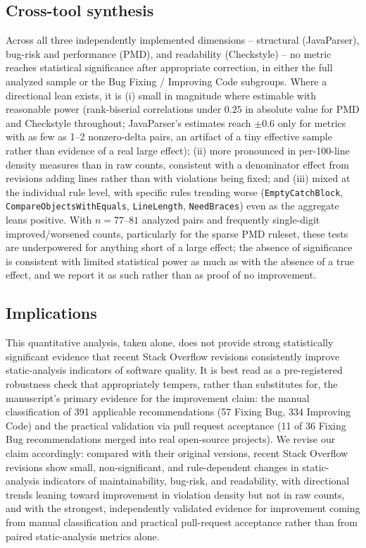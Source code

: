 \subsection{Cross-tool synthesis}
\label{sec:before-after-synthesis}

Across all three independently implemented dimensions -- structural
(JavaParser), bug-risk and performance (PMD), and readability
(Checkstyle) -- no metric reaches statistical significance after
appropriate correction, in either the full analyzed sample or the Bug
Fixing / Improving Code subgroups. Where a directional lean exists, it is
(i) small in magnitude where estimable with reasonable power (rank-biserial
correlations under $0.25$ in absolute value for PMD and Checkstyle
throughout; JavaParser's estimates reach $\pm0.6$ only for metrics with
as few as 1--2 nonzero-delta pairs, an artifact of a tiny effective
sample rather than evidence of a real large effect); (ii) more pronounced
in per-100-line density
measures than in raw counts, consistent with a denominator effect from
revisions adding lines rather than with violations being fixed; and
(iii) mixed at the individual rule level, with specific rules trending
worse (\texttt{EmptyCatchBlock}, \texttt{CompareObjectsWithEquals},
\texttt{LineLength}, \texttt{NeedBraces}) even as the aggregate leans
positive. With $n=77$--$81$ analyzed pairs and frequently single-digit
improved/worsened counts, particularly for the sparse PMD ruleset, these
tests are underpowered for anything short of a large effect; the
absence of significance is consistent with limited statistical power as
much as with the absence of a true effect, and we report it as such
rather than as proof of no improvement.

\subsection{Implications}
\label{sec:before-after-implications}

This quantitative analysis, taken alone, does not provide strong
statistically significant evidence that recent Stack Overflow revisions
consistently improve static-analysis indicators of software quality. It
is best read as a pre-registered robustness check that appropriately
tempers, rather than substitutes for, the manuscript's primary evidence
for the improvement claim: the manual classification of 391 applicable
recommendations (57 Fixing Bug, 334 Improving Code) and the practical
validation via pull request acceptance (11 of 36 Fixing Bug
recommendations merged into real open-source projects). We revise our
claim accordingly: compared with their original versions, recent Stack
Overflow revisions show small, non-significant, and rule-dependent
changes in static-analysis indicators of maintainability, bug-risk, and
readability, with directional trends leaning toward improvement in
violation density but not in raw counts, and with the strongest,
independently validated evidence for improvement coming from manual
classification and practical pull-request acceptance rather than from
paired static-analysis metrics alone.

